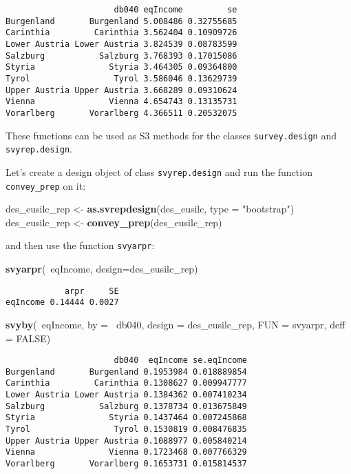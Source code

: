 \documentclass[]{book}
\newenvironment{Shaded}{\begin{snugshade}}{\end{snugshade}}
\newcommand{\KeywordTok}[1]{\textcolor[rgb]{0.13,0.29,0.53}{\textbf{{#1}}}}
\newcommand{\DataTypeTok}[1]{\textcolor[rgb]{0.13,0.29,0.53}{{#1}}}
\newcommand{\StringTok}[1]{\textcolor[rgb]{0.31,0.60,0.02}{{#1}}}
\newcommand{\OtherTok}[1]{\textcolor[rgb]{0.56,0.35,0.01}{{#1}}}
\newcommand{\NormalTok}[1]{{#1}}
\begin{document}
\begin{verbatim}
                      db040 eqIncome         se
Burgenland       Burgenland 5.008486 0.32755685
Carinthia         Carinthia 3.562404 0.10909726
Lower Austria Lower Austria 3.824539 0.08783599
Salzburg           Salzburg 3.768393 0.17015086
Styria               Styria 3.464305 0.09364800
Tyrol                 Tyrol 3.586046 0.13629739
Upper Austria Upper Austria 3.668289 0.09310624
Vienna               Vienna 4.654743 0.13135731
Vorarlberg       Vorarlberg 4.366511 0.20532075
\end{verbatim}

These functions can be used as S3 methods for the classes
\texttt{survey.design} and \texttt{svyrep.design}.

Let's create a design object of class \texttt{svyrep.design} and run the
function \texttt{convey\_prep} on it:

\begin{Shaded}
\begin{Highlighting}[]
\NormalTok{des_eusilc_rep <-}\StringTok{ }\KeywordTok{as.svrepdesign}\NormalTok{(des_eusilc, }\DataTypeTok{type =} \StringTok{"bootstrap"}\NormalTok{)}
\NormalTok{des_eusilc_rep <-}\StringTok{ }\KeywordTok{convey_prep}\NormalTok{(des_eusilc_rep) }
\end{Highlighting}
\end{Shaded}

and then use the function \texttt{svyarpr}:

\begin{Shaded}
\begin{Highlighting}[]
\KeywordTok{svyarpr}\NormalTok{(~eqIncome, }\DataTypeTok{design=}\NormalTok{des_eusilc_rep)}
\end{Highlighting}
\end{Shaded}

\begin{verbatim}
            arpr     SE
eqIncome 0.14444 0.0027
\end{verbatim}

\begin{Shaded}
\begin{Highlighting}[]
\KeywordTok{svyby}\NormalTok{(~eqIncome, }\DataTypeTok{by =} \NormalTok{~db040, }\DataTypeTok{design =} \NormalTok{des_eusilc_rep, }\DataTypeTok{FUN =} \NormalTok{svyarpr, }\DataTypeTok{deff =} \OtherTok{FALSE}\NormalTok{)}
\end{Highlighting}
\end{Shaded}

\begin{verbatim}
                      db040  eqIncome se.eqIncome
Burgenland       Burgenland 0.1953984 0.018889854
Carinthia         Carinthia 0.1308627 0.009947777
Lower Austria Lower Austria 0.1384362 0.007410234
Salzburg           Salzburg 0.1378734 0.013675849
Styria               Styria 0.1437464 0.007245868
Tyrol                 Tyrol 0.1530819 0.008476835
Upper Austria Upper Austria 0.1088977 0.005840214
Vienna               Vienna 0.1723468 0.007766329
Vorarlberg       Vorarlberg 0.1653731 0.015814537
\end{verbatim}
\end{document}
